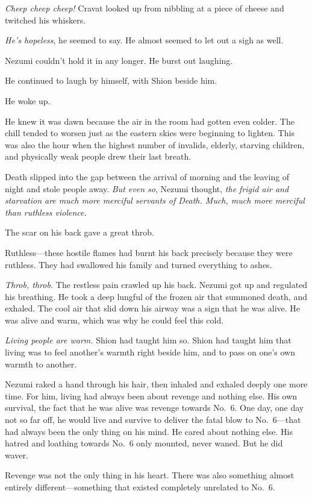 \emph{Cheep cheep cheep!} Cravat looked up from nibbling at a piece of cheese
and twitched his whiskers.

\emph{He's hopeless}, he seemed to say. He almost seemed to let out a sigh as
well.

Nezumi couldn't hold it in any longer. He burst out laughing.

He continued to laugh by himself, with Shion beside him.

\mybreak

He woke up.

He knew it was dawn because the air in the room had gotten even colder.
The chill tended to worsen just as the eastern skies were beginning to
lighten. This was also the hour when the highest number of invalids,
elderly, starving children, and physically weak people drew their last
breath.

Death slipped into the gap between the arrival of morning and the
leaving of night and stole people away. \emph{But even so}, Nezumi thought, \emph{the
frigid air and starvation are much more merciful servants of Death.
Much, much more merciful than ruthless violence.}

The scar on his back gave a great throb.

Ruthless---these hostile flames had burnt his back precisely because they
were ruthless. They had swallowed his family and turned everything to
ashes.

\emph{Throb, throb.} The restless pain crawled up his back. Nezumi got up and
regulated his breathing. He took a deep lungful of the frozen air that
summoned death, and exhaled. The cool air that slid down his airway was
a sign that he was alive. He was alive and warm, which was why he could
feel this cold.

\emph{Living people are warm.} Shion had taught him so. Shion had taught him
that living was to feel another's warmth right beside him, and to pass
on one's own warmth to another.

Nezumi raked a hand through his hair, then inhaled and exhaled deeply
one more time. For him, living had always been about revenge and nothing
else. His own survival, the fact that he was alive was revenge towards
No.~6. One day, one day not so far off, he would live and survive to
deliver the fatal blow to No.~6---that had always been the only thing on
his mind. He cared about nothing else. His hatred and loathing towards
No.~6 only mounted, never waned. But he did waver.

Revenge was not the only thing in his heart. There was also something
almost entirely different---something that existed completely unrelated to
No.~6.

